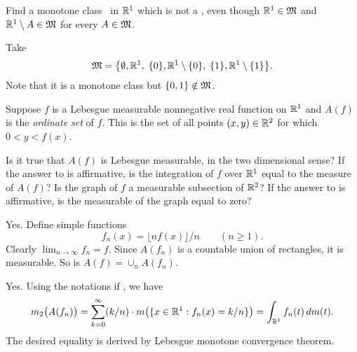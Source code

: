 \begin{enumerate}


\begin{excopy}
Find a monotone class \frakM\ in \(\mathbb{R}^1\) which is not a \salgebra,
even though \(\mathbb{R}^1 \in \mathfrak{M}\) and \(\mathbb{R}^1\setminus A \in \mathfrak{M}\)
for every \(A\in \mathfrak{M}\).
\end{excopy}

Take
\begin{equation*}
\mathfrak{M} = \bigl\{\emptyset, \mathbb{R}^1, \; 
                \{0\}, \mathbb{R}^1\setminus\{0\}, \;
                \{1\}, \mathbb{R}^1\setminus\{1\}  \bigr\}.
\end{equation*}
Note that it is a monotone class but \(\{0,1\}\notin \mathfrak{M}\).


\begin{excopy}
Suppose $f$ is a Lebesgue measurable nonnegative real function on \(\mathbb{R}^1\)
and \(A(f)\) is the 
\emph{ordinate set}
of $f$. This is the set of all points \((x,y)\in\mathbb{R}^2\) for which \(0<y<f(x)\).
\begin{itemize}
 Is it true that \(A(f)\) is Lebesgue measurable, 
           in the two dimensional sense?
 If the answer to  is affirmative, 
           is the integration of $f$ over \(\mathbb{R}^1\) 
           equal to the measure of \(A(f)\)?
 Is the graph of $f$ a measurable subsection of \(\mathbb{R}^2\)?
 If the answer to  is affirmative, 
           is the measurable of the graph equal to zero?
\end{itemize}
\end{excopy}

\begin{itemize}
Yes.
Define simple functions
\begin{equation*}
f_n(x) = \lfloor nf(x)\rfloor / n \qquad (n\geq 1).
\end{equation*}
Clearly \(\lim_{n\to\infty} f_n = f\).
Since \(A(f_n)\) is a countable union of rectangles, it is measurable.
So is \(A(f) = \cup_n A(f_n)\).

Yes. Using the notations if , we have 
\begin{equation*}
m_2\bigl(A(f_n)\bigr) 
= \sum_{k=0}^\infty (k/n)\cdot m\bigl(\{x\in\mathbb{R}^1: f_n(x) = k/n\}\bigr)
= \int_{\mathbb{R}^1} f_n(t)\,dm(t).
\end{equation*}
The desired equality is derived 
by Lebesgue monotone convergence theorem.


\end{itemize}
\end{enumerate}
